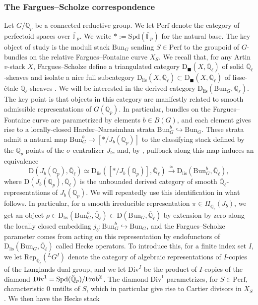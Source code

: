 \documentclass[reqno,11pt]{amsart}
\theoremstyle{remark}
\newcommand{\Q}{\mathbb{Q}}
\newcommand{\ov}{\overline}
\newcommand{\Spd}{\mathrm{Spd}}
\newcommand{\Bun}{\mathrm{Bun}}
\newcommand{\Rep}{\mathrm{Rep}}
\newcommand{\Dc}{\mathrm{D}}
\newcommand{\Dlis}{\mathrm{D}_{\mathrm{lis}}}
\newcommand{\Perf}{\mathrm{Perf}}
\def\ol{\overline}
\def\ra{\rightarrow}
\def\Div{\mathrm{Div}}
\begin{document}
\subsubsection{The Fargues--Scholze correspondence}{\label{ss: FSLLC}}
Let $G/\mathbb{Q}_{p}$ be a connected reductive group. We let $\Perf$ denote the category of perfectoid spaces over $\ol{\mathbb{F}}_{p}$. We write $\ast := \Spd(\ol{\mathbb{F}}_{p})$ for the natural base. The key object of study is the moduli stack $\Bun_{G}$ sending $S \in \Perf$ to the groupoid of $G$-bundles on the relative Fargues--Fontaine curve $X_{S}$. We recall that, for any Artin $v$-stack $X$, Fargues--Scholze define a triangulated category $\Dc_{\blacksquare}(X,\overline{\mathbb{Q}}_{\ell})$ of solid $\overline{\mathbb{Q}}_{\ell}$-sheaves \cite[Section~VII.1]{FS} and isolate a nice full subcategory $\Dlis(X,\overline{\mathbb{Q}}_{\ell}) \subset \Dc_{\blacksquare}(X,\overline{\mathbb{Q}}_{\ell})$ of lisse-\'etale $\overline{\mathbb{Q}}_{\ell}$-sheaves \cite[Section~VII.6.]{FS}. We will be interested in the derived category $\Dlis(\Bun_{G},\ol{\mathbb{Q}}_{\ell})$. The key point is that objects in this category are manifestly related to smooth admissible representations of $G(\mathbb{Q}_{p})$. In particular, bundles on the Fargues--Fontaine curve are parametrized by elements $b \in B(G)$, and each element gives rise to a locally-closed Harder--Narasimhan strata $\Bun_{G}^{b} \hookrightarrow \Bun_{G}$. These strata admit a natural map $\Bun_{G}^{b} \ra [\ast/J_{b}(\mathbb{Q}_{p})]$ to the classifying stack defined by the $\mathbb{Q}_{p}$-points of the $\sigma$-centralizer $J_{b}$, and, by \cite[Proposition~VII.7.1]{FS}, pullback along this map induces an equivalence
\[ \Dc(J_{b}(\mathbb{Q}_{p}),\ol{\mathbb{Q}}_{\ell}) \simeq \Dlis([\ast/J_{b}(\mathbb{Q}_{p})],\ol{\mathbb{Q}}_{\ell}) \xrightarrow{\simeq} \Dlis(\Bun_{G}^{b},\ol{\mathbb{Q}}_{\ell}), \]
where $\Dc(J_{b}(\mathbb{Q}_{p}),\ol{\mathbb{Q}}_{\ell})$ is the unbounded derived category of smooth $\ol{\mathbb{Q}}_{\ell}$-representations of 
$J_{b}(\mathbb{Q}_{p})$. We will repeatedly use this identification in what follows. In particular, for a smooth irreducible representation $\pi \in \Pi_{\ov{\Q}_{\ell}}(J_{b})$, we get an object $\rho \in \Dlis(\Bun_{G}^{b},\ol{\mathbb{Q}}_{\ell}) \subset \Dc(\Bun_{G},\ol{\mathbb{Q}}_{\ell})$ by extension by zero along the locally closed embedding $j_{b}: \Bun_{G}^{b} \hookrightarrow \Bun_{G}$, and the Fargues--Scholze parameter comes from acting on this representation by endofunctors of $\Dlis(\Bun_{G},\ol{\mathbb{Q}}_{\ell})$ called Hecke operators. To introduce this, for a finite index set $I$, we let $\Rep_{\ol{\mathbb{Q}}_{\ell}}(\phantom{}^{L}G^{I})$ denote the category of algebraic representations of $I$-copies of the Langlands dual group, and we let $\Div^{I}$ be the product of $I$-copies of the diamond $\Div^{1} = \Spd(\Breve{\mathbb{Q}}_{p})/\mathrm{Frob}^{\mathbb{Z}}$. The diamond $\Div^{1}$ parametrizes, for $S \in \Perf$, characteristic $0$ untilts of $S$, which in particular give rise to Cartier divisors in $X_{S}$. We then have the Hecke stack
\end{document}

